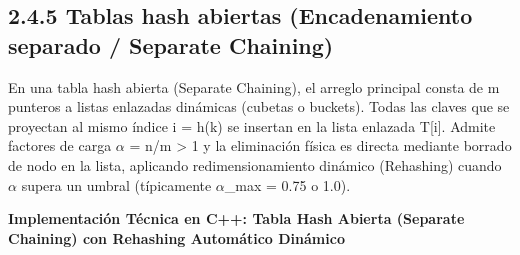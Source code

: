 \documentclass[11pt,letterpaper]{article}
\begin{document}
\subsection*{2.4.5 Tablas hash abiertas (Encadenamiento separado / Separate Chaining)}
En una tabla hash abierta (Separate Chaining), el arreglo principal consta de m punteros a listas enlazadas dinámicas (cubetas o buckets). Todas las claves que se proyectan al mismo índice i = h(k) se insertan en la lista enlazada T[i]. Admite factores de carga $\alpha$ = n/m > 1 y la eliminación física es directa mediante borrado de nodo en la lista, aplicando redimensionamiento dinámico (Rehashing) cuando $\alpha$ supera un umbral (típicamente $\alpha$\_max = 0.75 o 1.0).\par
\vspace{4pt}\noindent\textbf{\color{ipnblue}Implementación Técnica en C++: Tabla Hash Abierta (Separate Chaining) con Rehashing Automático Dinámico}\par\vspace{-2pt}
\end{document}
